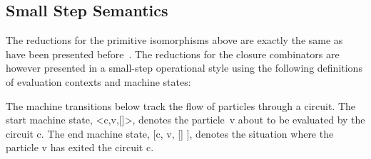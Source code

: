 \documentclass[preprint]{sigplanconf}
\begin{document}


\subsection{Small Step Semantics}

The reductions for the primitive isomorphisms above are exactly the same as
have been presented before~\cite{infeffects}. The reductions for the closure
combinators are however presented in a small-step operational style using the
following definitions of evaluation contexts and machine states:

\begin{scriptsize}
\end{scriptsize}
The machine transitions below track the flow of particles through a
circuit. The start machine state, {{<c,v,[]>}}, denotes the
particle~{{v}} about to be evaluated by the circuit {{c}}. The end
machine state, {{[c, v, [] ]}}, denotes the situation where the particle
{{v}} has exited the circuit {{c}}.
\end{document}
